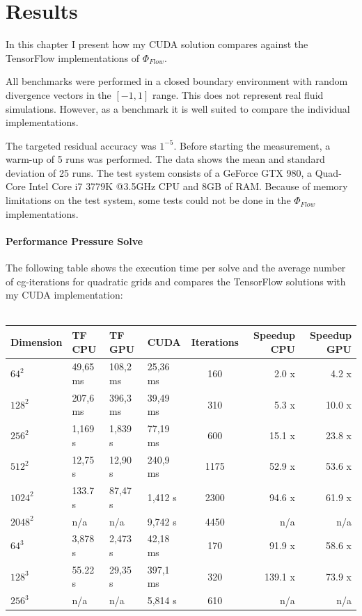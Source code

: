 \chapter{Results}\label{chapter:results}

In this chapter I present how my CUDA solution compares against the TensorFlow implementations of $\Phi_{Flow}$.
\par All benchmarks were performed in a closed boundary environment with random divergence vectors in the $\left[-1, 1 \right]$ range. This does not represent real fluid simulations. However, as a benchmark it is well suited to compare the individual implementations. 
\par The targeted residual accuracy was $1^{-5}$. Before starting the measurement, a warm-up of 5 runs was performed. The data shows the mean and standard deviation of 25 runs. The test system consists of a GeForce GTX 980, a Quad-Core Intel Core i7 3779K @3.5GHz CPU and 8GB of RAM. Because of memory limitations on the test system, some tests could not be done in the $\Phi_{Flow}$ implementations.
\subsubsection{Performance Pressure Solve}
The following table shows the execution time per solve and the average number of cg-iterations for quadratic grids and compares the TensorFlow solutions with my CUDA implementation: \\\\
\renewcommand{\arraystretch}{1.36}
\small
\begin{tabular}{l||l|l|l||c||r|r}
\hline
Dimension & TF CPU   & TF GPU   & CUDA     & Iterations & Speedup CPU & Speedup GPU \\ \hline
$64^2$   & 49,65 ms & 108,2 ms & 25,36 ms & 160  & 2.0 x   & 4.2 x  \\ \hline
$128^2$  & 207,6 ms & 396,3 ms & 39,49 ms & 310  & 5.3 x   & 10.0 x \\ \hline
$256^2$  & 1,169 s  & 1,839 s  & 77,19 ms & 600  & 15.1 x  & 23.8 x \\ \hline
$512^2$  & 12,75 s  & 12,90 s  & 240,9 ms & 1175 & 52.9 x  & 53.6 x \\ \hline
$1024^2$ & 133.7 s  & 87,47 s  & 1,412 s  & 2300 & 94.6 x  & 61.9 x \\ \hline
$2048^2$ & n/a      & n/a      & 9,742 s  & 4450 & n/a     & n/a    \\ \hline \hline

$64^3$   & 3,878 s  & 2,473 s  & 42,18 ms & 170 & 91.9 x  & 58.6 x \\ \hline
$128^3$  & 55.22 s  & 29,35 s  & 397,1 ms & 320 & 139.1 x & 73.9 x \\ \hline
$256^3$  & n/a      & n/a      & 5,814 s  & 610 & n/a  & n/a 		  \\ \hline
\end{tabular}
\normalsize

